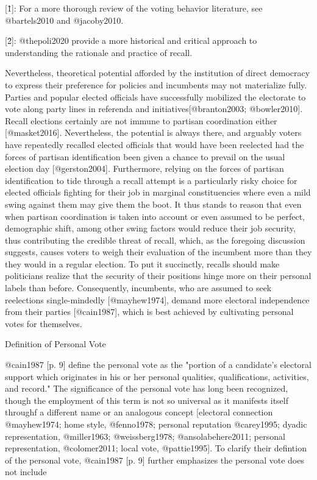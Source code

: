 \documentclass[hyphens, crop=false]{standalone}
\begin{document}
	[\^1]: For a more thorough review of the voting behavior literature, see @bartels2010 and @jacoby2010.
	
	[\^2]: @thepoli2020 provide a more historical and critical approach to understanding the rationale and practice of recall.
	
		Nevertheless,
		theoretical potential afforded by the institution of direct democracy to express their preference for policies and incumbents may not materialize fully.
		Parties and popular elected officials have successfully mobilized the electorate to vote along party lines in referenda and initiatives[@branton2003; @bowler2010].
		Recall elections certainly are not immune to partisan coordination either [@masket2016].
		Nevertheless,
		the potential is always there,
		and arguably voters have repeatedly recalled elected officials
		that would have been reelected had the forces of partisan identification been given a chance to prevail on the usual election day [@gerston2004].
		Furthermore,
		relying on the forces of partisan identification to tide through a recall attempt is a particularly risky choice
		for elected officials fighting for their job in marginal constituencies where even a mild swing against them may give them the boot.
		It thus stands to reason that even when partisan coordination is taken into account or even assumed to be perfect,
		demographic shift,
		among other swing factors would reduce their job security,
		thus contributing the credible threat of recall,
		which,
		as the foregoing discussion suggests,
		causes voters to weigh their evaluation of the incumbent more than they they would in a regular election.
		To put it succinctly, recalls should make politicians realize that the security of their positions hinge more on their personal labels than before.
		Consequently,
		incumbents,
		who are assumed to seek reelections single-mindedly [@mayhew1974],
		demand more electoral independence from their parties [@cain1987],
		which is best achieved by cultivating personal votes for themselves.
	
		Definition of Personal Vote
	
		@cain1987 [p. 9] define the personal vote as the "portion of a candidate's electoral support which originates in his or her
		personal qualities,
		qualifications,
		activities,
		and record."
		The significance of the personal vote has long been recognized,
		though the employment of this term is not so universal as it manifests itself throughf a different name or an analogous concept [electoral connection @mayhew1974; home style,
		 @fenno1978; personal reputation @carey1995; dyadic representation,
		 @miller1963; @weissberg1978; @ansolabehere2011; personal representation,
		 @colomer2011; local vote,
		 @pattie1995].
		 To clarify their defintion of the personal vote,
		 @cain1987 [p.
		 9] further emphasizes the personal vote does not include
	
\end{document}

